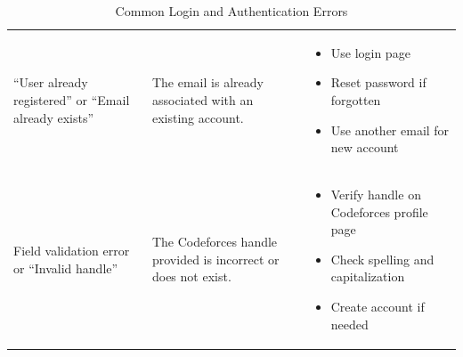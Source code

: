 \documentclass[12pt]{article}
\begin{document}
\begin{table}[h]
\begin{tabularx}{\textwidth}{>{\raggedright\arraybackslash}p{4cm}
>{\raggedright\arraybackslash}p{5cm}
>{\raggedright\arraybackslash}X}
\vspace{0.3pt}``User already registered'' or ``Email already exists''
& \vspace{0.3pt}The email is already associated with an existing account.
& \begin{itemize}
\item Use login page
\item Reset password if forgotten
\item Use another email for new account
\end{itemize} \\ 

\vspace{0.3pt}Field validation error or ``Invalid handle''
& \vspace{0.3pt}The Codeforces handle provided is incorrect or does not exist.
& \begin{itemize}
\item Verify handle on Codeforces profile page
\item Check spelling and capitalization
\item Create account if needed
\end{itemize} \\
\bottomrule
\end{tabularx}
\caption{Common Login and Authentication Errors}
\end{table}
\newpage
\end{document}
